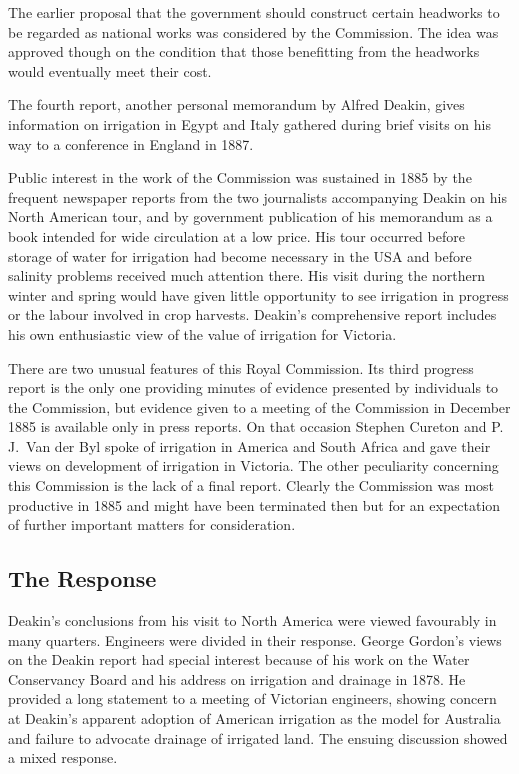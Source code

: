 The earlier proposal that the government should construct certain
headworks to be regarded as national works was considered by the
Commission.  The idea was approved though on the condition that those
benefitting from the headworks would eventually meet their cost.

The fourth report, another personal memorandum by Alfred Deakin, gives
information on irrigation in Egypt and Italy gathered during brief
visits on his way to a conference in England in 1887.

Public interest in the work of the Commission was sustained in 1885 by
the frequent newspaper reports from the two journalists accompanying
Deakin on his North American tour, and by government publication of
his memorandum as a book intended for wide circulation at a low price.
His tour occurred before storage of water for irrigation had become
necessary in the USA and before salinity problems received much
attention there.  His visit during the northern winter and spring
would have given little opportunity to see irrigation in progress or
the labour involved in crop harvests.  Deakin's comprehensive report
includes his own enthusiastic view of the value of irrigation for
Victoria.

There are two unusual features of this Royal Commission.  Its third
progress report is the only one providing minutes of evidence
presented by individuals to the Commission, but evidence given to a
meeting of the Commission in December 1885 is available only in press
reports.  On that occasion Stephen Cureton and P.\,J.~Van der Byl
spoke of irrigation in America and South Africa and gave their views
on development of irrigation in Victoria.  The other peculiarity concerning this Commission is the
lack of a final report.  Clearly the Commission was most productive in
1885 and might have been terminated then but for an expectation of
further important matters for consideration.

\subsection*{The Response}

Deakin's conclusions from his visit to North America were viewed
favourably in many quarters.  Engineers were divided in their
response.  George Gordon's views on the Deakin report had special
interest because of his work on the Water Conservancy Board and his
address on irrigation and drainage in 1878.  He provided a long
statement to a meeting of Victorian engineers, showing concern at
Deakin's apparent adoption of American irrigation as the model for
Australia and failure to advocate drainage of irrigated land.  The
ensuing discussion showed a mixed response.

